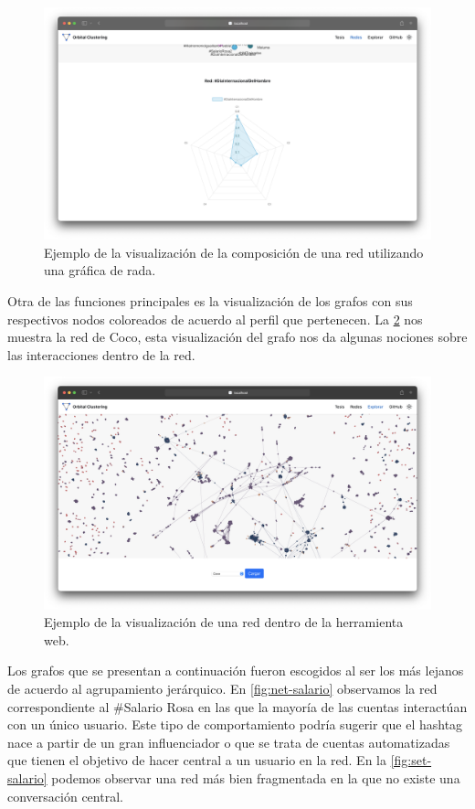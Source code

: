  \begin{figure}
   \centering
   \includegraphics[width=1\textwidth]{images/web-comp.png}
    \caption{Ejemplo de la visualización de la composición de una red utilizando una gráfica de rada.}
    \label{img:web-comp}
\end{figure}

Otra de las funciones principales es la visualización de los grafos con sus respectivos nodos coloreados de acuerdo al perfil que pertenecen. La \ref{img:web-graph} nos muestra la red de Coco, esta visualización del grafo nos da algunas nociones sobre las interacciones dentro de la red.

 \begin{figure}
   \centering
   \includegraphics[width=1\textwidth]{images/web-graph.png}
    \caption{Ejemplo de la visualización de una red dentro de la herramienta web.}
    \label{img:web-graph}
\end{figure}

Los grafos que se presentan a continuación fueron escogidos al ser los más lejanos de acuerdo al agrupamiento jerárquico. En \ref{fig:net-salario} observamos la red correspondiente al \#Salario Rosa en las que la mayoría de las cuentas interactúan con un único usuario. Este tipo de comportamiento podría sugerir que el hashtag nace a partir de un gran influenciador o que se trata de cuentas automatizadas que tienen el objetivo de hacer central a un usuario en la red. En la \ref{fig:set-salario} podemos observar una red más bien fragmentada en la que no existe una conversación central.

